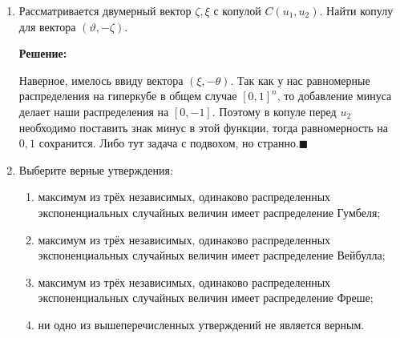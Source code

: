 \documentclass[%
12pt, %
final, %
oneside, %
onecolumn, %
centertags]{article} %
\theoremstyle{plain}
\theoremstyle{definition}
\theoremstyle{remark}
\begin{document}
\begin{enumerate}
\textbf{Решение:}

$$F_{X_1, X_2}(x_1, x_2) = C(F_{X_1}(x_1), F_{X_2}(x_2))$$

Сначала найдем маргинальные распределения по следующим формулам:
$$F_{X_1}(x1) = F_{X_1, X_2}(x_1, x_2 \to \infty) = \frac{\sqrt{x_1}}{1 - \sqrt{x_1}}$$
$$F_{X_2}(x_2) = F_{X_1, X_2}(x_1 \to \infty, x_2) = \frac{x_2^2}{4-x_2^2}$$

Теперь необходимо найти копулу. Чуть перезапишем функцию начальную:
$$F(x_1, x_2) = \frac{1}{\frac{4}{x_2^2} + \frac{1}{\sqrt{x_1}}- 1}$$

Теперь выразим $\sqrt{x_1}$ и $x_2^2$ через маргинальные функции распределения:
$$\sqrt{x_1} = \frac{F_{X_1}(x_1)}{1 + F_{X_1}(x_1)}$$
$$x_2^2 = \frac{4 \cdot F_{X_2}(x_2)}{1 + F_{X_2}(x_2)}$$

Тогда, обозначая наши маргинальные распределения за $u_1$ и $u_2$ получим формулу копулы:
$$C(u_1, u_2) =  \frac{1}{\frac{4}{\frac{4 \cdot u_2}{1 + u_2}} + \frac{1}{\frac{u_1}{1 + u_1}}- 1} \eqno \blacksquare$$


\item Рассматривается двумерный вектор $\zeta,\xi$ с копулой $C(u_1,u_2).$ Найти копулу для вектора $(\vartheta,-\zeta).$

\textbf{Решение:} 

Наверное, имелось ввиду вектора $(\xi, -\theta)$. Так как у нас равномерные распределения на гиперкубе в общем случае $[0,1]^n$, то добавление минуса делает наши распределения на $[0,-1]$. Поэтому в копуле перед $u_2$ необходимо поставить знак минус в этой функции, тогда равномерность на $0,1$ сохранится. Либо тут задача с подвохом, но странно.$\blacksquare$

\item Выберите верные утверждения:
\begin{enumerate}
\setlength\itemsep{-0.15em}
    \item максимум из трёх независимых, одинаково распределенных экспоненциальных случайных величин имеет распределение Гумбеля;
    \item максимум из трёх независимых, одинаково распределенных экспоненциальных случайных величин имеет распределение Вейбулла;
    \item максимум из трёх независимых, одинаково распределенных экспоненциальных случайных величин имеет распределение Фреше;
    \item ни одно из вышеперечисленных утверждений не является верным.
\end{enumerate}


\end{enumerate}
\end{document}
